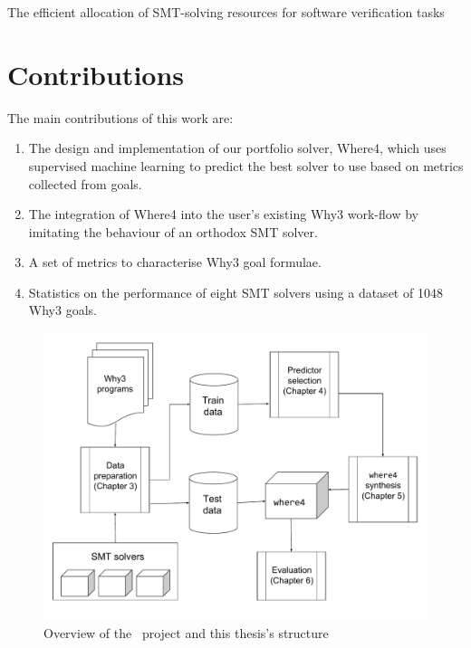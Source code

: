 The efficient allocation of SMT-solving resources for software verification tasks

\section{Contributions}
The main contributions of this work are:
\begin{enumerate}
	\item The design  and implementation of our portfolio solver, \textsf{Where4}, which uses supervised machine learning to predict the best solver to use based on metrics collected from goals.
	\item The integration of \textsf{Where4} into the user's existing \textsf{Why3} work-flow by imitating the behaviour of an orthodox SMT solver.
	\item A set of metrics to characterise \textsf{Why3} goal formulae.
	\item Statistics on the performance of eight SMT solvers using a dataset of 1048 \textsf{Why3} goals.
	
\end{enumerate}

\begin{figure}
\centering
\includegraphics[width=0.9\linewidth]{Figures/intoduction}
\caption{Overview of the \where~project and this thesis's structure}
\label{fig:introduction}
\end{figure}

